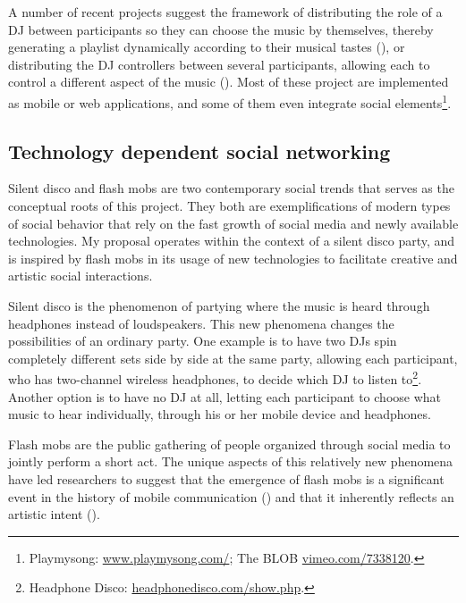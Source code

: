 \documentclass[a4paper,11pt]{article}
\begin{document}
A number of recent projects suggest the framework of distributing the role of a DJ between participants so they can choose the music by themselves, thereby generating a playlist dynamically according to their musical tastes (\cite{web:shaw}), or distributing the DJ controllers between several participants, allowing each to control a different aspect of the music (\cite{web:shapira}).
Most of these project are implemented as mobile or web applications, and some of them even integrate social elements\footnote{Playmysong: \href{http://www.playmysong.com/}{www.playmysong.com/}; The BLOB \href{http://vimeo.com/7338120}{vimeo.com/7338120}.}.

\subsection{Technology dependent social networking} \label{literature:social_tech}

Silent disco and flash mobs are two contemporary social trends that serves as the conceptual roots of this project.
They both are exemplifications of modern types of social behavior that rely on the fast growth of social media and newly available technologies.
My proposal operates within the context of a silent disco party, and is inspired by flash mobs in its usage of new technologies to facilitate creative and artistic social interactions.

Silent disco is the phenomenon of partying where the music is heard through headphones instead of loudspeakers.
This new phenomena changes the possibilities of an ordinary party.
One example is to have two DJs spin completely different sets side by side at the same party, allowing each participant, who has two-channel wireless headphones, to decide which DJ to listen to\footnote{Headphone Disco: \href{http://headphonedisco.com/show.php}{headphonedisco.com/show.php}.}.
Another option is to have no DJ at all, letting each participant to choose what music to hear individually, through his or her mobile device and headphones.

Flash mobs are the public gathering of people organized through social media to jointly perform a short act.
The unique aspects of this relatively new phenomena have led researchers to suggest that the emergence of flash mobs is a significant event in the history of mobile communication (\cite{nicholson05}) and that it inherently reflects an artistic intent (\cite{brejzek10}).
\end{document}
